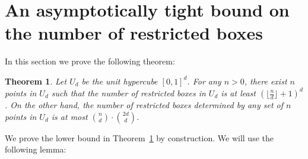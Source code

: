 \documentclass[11pt]{article}
\newtheorem{theorem}{Theorem}
\begin{document}
\section{An asymptotically tight bound on the number of restricted
boxes}\label{sec:restricted} 

In this section we prove the following theorem:

\begin{theorem}\label{thm:restricted}
Let $U_d$ be the unit hypercube $[0,1]^d$.
For any $n > 0$, there exist $n$ points in $U_d$
such that the number of restricted boxes in $U_d$
is at least
$(\lfloor \frac{n}{d} \rfloor + 1)^d$.
On the other hand,
the number of restricted boxes determined by any set of $n$ points in $U_d$
is at most
${n \choose d} \cdot {2d \choose d}$.
\end{theorem}


We prove the lower bound in Theorem~\ref{thm:restricted} by construction.
We will use the following lemma:
\end{document}
